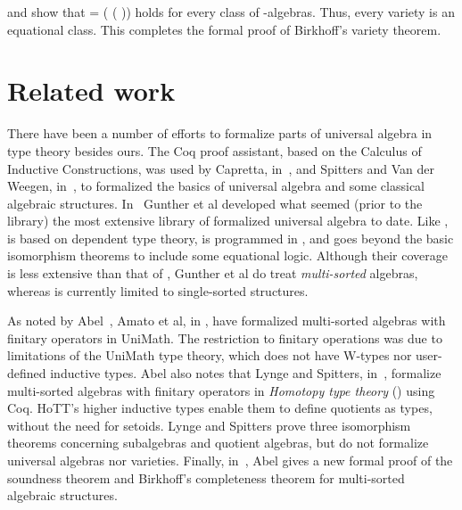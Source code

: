  and  show that
  =  ( ( )) holds for every class  of -algebras.
Thus, every variety is an equational class. This completes the formal proof of Birkhoff's variety theorem.

\section{Related work}
There have been a number of efforts to formalize parts of universal algebra in
type theory besides ours. The Coq proof assistant, based on the Calculus of
Inductive Constructions, was used by Capretta, in~\cite{Capretta:1999}, and
Spitters and Van der Weegen, in~\cite{Spitters:2011}, to formalized the basics
of universal algebra and some classical algebraic structures.
In~\cite{Gunther:2018} Gunther et al developed what seemed (prior to the \agdaalgebras
library) the most extensive library of formalized universal algebra to date.
Like \agdaalgebras,~\cite{Gunther:2018} is based on dependent type theory, is programmed
in \agda, and goes beyond the basic isomorphism theorems to include some equational logic.
Although their coverage is less extensive than that of \agdaalgebras, Gunther et al do treat
\emph{multi-sorted} algebras, whereas \agdaalgebras is currently limited to single-sorted structures.

As noted by Abel~\cite{Abel:2021}, Amato et al, in \cite{Amato:2021}, have
formalized multi-sorted algebras with finitary operators in UniMath. The restriction to
finitary operations was due to limitations of the UniMath type theory, which does
not have W-types nor user-defined inductive types.
Abel also notes that Lynge and Spitters, in~\cite{Lynge:2019}, formalize multi-sorted
algebras with finitary operators in \emph{Homotopy type theory} (\cite{HoTT}) using
Coq.  HoTT's higher inductive types enable them to define quotients as types, without
the need for setoids.  Lynge and Spitters prove three isomorphism theorems concerning
subalgebras and quotient algebras, but do not formalize universal algebras nor varieties.
Finally, in~\cite{Abel:2021}, Abel gives a new formal proof of the soundness theorem and
Birkhoff's completeness theorem for multi-sorted algebraic structures.


